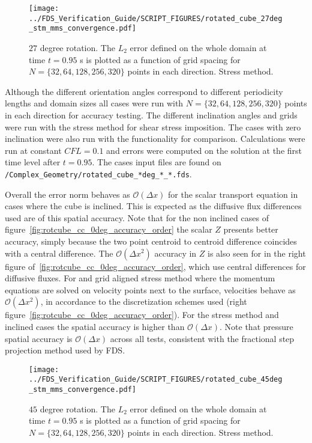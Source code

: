 \documentclass[11pt]{book}
\begin{document}
\begin{figure}[ht]
\centering
\texttt{[image: ../FDS\_Verification\_Guide/SCRIPT\_FIGURES/rotated\_cube\_27deg\_stm\_mms\_convergence.pdf]}
\caption[The  accuracy order test case]{$27$ degree rotation. The $L_2$ error defined on the whole domain at time $t = 0.95$ s is plotted as a function of grid spacing for $N=\{32,64,128,256,320\}$ points in each direction. Stress method.}\label{fig:rotcube_cc_27deg_accuracy_order}
\end{figure}

Although the different orientation angles correspond to different periodicity lengths and domain sizes all cases were run with $N=\{32,64,128,256,320\}$ points in each direction for accuracy testing. The different inclination angles and grids were run with the stress method for shear stress imposition. The cases with zero inclination were also run with the  functionality for comparison. Calculations were run at constant $CFL=0.1$ and errors were computed on the solution at the first time level after $t=0.95$. The cases input files are found on \texttt{/Complex\_Geometry/rotated\_cube\_*deg\_*\_*.fds}.

Overall the error norm behaves as $\mathcal{O}(\Delta x)$ for the scalar transport equation in cases where the cube is inclined. This is expected as the diffusive flux differences used are of this spatial accuracy. Note that for the non inclined cases of figure~\ref{fig:rotcube_cc_0deg_accuracy_order} the scalar $Z$ presents better accuracy, simply because the two point centroid to centroid difference coincides with a central difference.
The $\mathcal{O}(\Delta x^2)$ accuracy in $Z$ is also seen for  in the right figure of~\ref{fig:rotcube_cc_0deg_accuracy_order}, which use central differences for diffusive fluxes.
For  and grid aligned stress method where the momentum equations are solved on velocity points next to the surface, velocities behave as $\mathcal{O}(\Delta x^2)$, in accordance to the discretization schemes used (right figure~\ref{fig:rotcube_cc_0deg_accuracy_order}). For the stress method and inclined cases the spatial accuracy is higher than $\mathcal{O}(\Delta x)$. Note that pressure spatial accuracy is $\mathcal{O}(\Delta x)$ across all tests, consistent with the fractional step projection method used by FDS.

\begin{figure}[ht]
\centering
\texttt{[image: ../FDS\_Verification\_Guide/SCRIPT\_FIGURES/rotated\_cube\_45deg\_stm\_mms\_convergence.pdf]}
\caption[The  accuracy order test case]{$45$ degree rotation. The $L_2$ error defined on the whole domain at time $t = 0.95$ s is plotted as a function of grid spacing for $N=\{32,64,128,256,320\}$ points in each direction. Stress method.}\label{fig:rotcube_cc_45deg_accuracy_order}
\end{figure}
\end{document}
